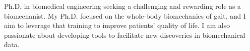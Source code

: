 \small{
Ph.D. in biomedical engineering seeking a challenging and rewarding role as a biomechanist. My Ph.D. focused on the whole-body biomechanics of gait, and I aim to leverage that training to improve patients' quality of life. I am also passionate about developing tools to facilitate new discoveries in biomechanical data.
}